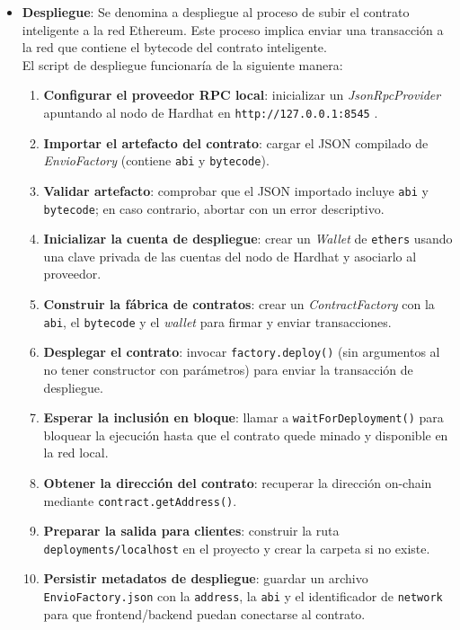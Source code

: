 \begin{itemize}
Los outputs de la compilación es lo que se utilizará a nivel de la lógica de la aplicación para interactuar con el
contrato inteligente y a su vez con la red Ethereum.

\item \textbf{Despliegue}: Se denomina a despliegue al proceso de subir el contrato inteligente a la red Ethereum. Este
proceso implica enviar una transacción a la red que contiene el bytecode del contrato inteligente.\\
El script de despliegue funcionaría de la siguiente manera:
\begin{enumerate}
\item \textbf{Configurar el proveedor RPC local}: inicializar un \textit{JsonRpcProvider} apuntando al nodo de Hardhat en \texttt{http://127.0.0.1:8545}
.
\item \textbf{Importar el artefacto del contrato}: cargar el JSON compilado de \textit{EnvioFactory} (contiene \texttt{abi} y \texttt{bytecode}).
\item \textbf{Validar artefacto}: comprobar que el JSON importado incluye \texttt{abi} y \texttt{bytecode}; en caso contrario, abortar con un error descriptivo.
\item \textbf{Inicializar la cuenta de despliegue}: crear un \textit{Wallet} de \texttt{ethers} usando una clave privada de las cuentas del nodo de Hardhat y asociarlo al proveedor.
\item \textbf{Construir la fábrica de contratos}: crear un \textit{ContractFactory} con la \texttt{abi}, el \texttt{bytecode} y el \textit{wallet} para firmar y enviar transacciones.
\item \textbf{Desplegar el contrato}: invocar \texttt{factory.deploy()} (sin argumentos al no tener constructor con parámetros) para enviar la transacción de despliegue.
\item \textbf{Esperar la inclusión en bloque}: llamar a \texttt{waitForDeployment()} para bloquear la ejecución hasta que el contrato quede minado y disponible en la red local.
\item \textbf{Obtener la dirección del contrato}: recuperar la dirección on-chain mediante \texttt{contract.getAddress()}.
\item \textbf{Preparar la salida para clientes}: construir la ruta \texttt{deployments/localhost} en el proyecto y crear la carpeta si no existe.
\item \textbf{Persistir metadatos de despliegue}: guardar un archivo \texttt{EnvioFactory.json} con la \texttt{address}, la \texttt{abi} y el identificador de \texttt{network} para que frontend/backend puedan conectarse al contrato.
\end{enumerate}

\end{itemize}

